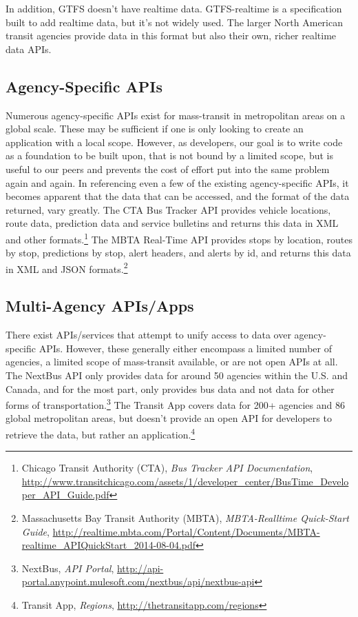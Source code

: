 \documentclass[12pt]{article}
\begin{document}
In addition, GTFS doesn't have realtime data. GTFS-realtime is a specification built to add
realtime data, but it's not widely used. The larger North American transit agencies provide
data in this format but also their own, richer realtime data APIs.

\subsection{Agency-Specific APIs}

Numerous agency-specific APIs exist for mass-transit in metropolitan areas on a global scale.
These may be sufficient if one is only looking to create an application with a local scope. However,
as developers, our goal is to write code as a foundation to be built upon, that is not bound by a
limited scope, but is useful to our peers and prevents the cost of effort put into the same 
problem again and again. In referencing even a few of the existing agency-specific APIs, it
becomes apparent that the data that can be accessed, and the format of the data returned, 
vary greatly. The CTA Bus Tracker API provides vehicle locations, route data, prediction data and 
service bulletins and returns this data in XML and other formats.\footnote{Chicago Transit Authority (CTA), \textit{Bus Tracker API Documentation},
\url{http://www.transitchicago.com/assets/1/developer\_center/BusTime\_Developer\_API\_Guide.pdf}} The MBTA Real-Time API provides
stops by location, routes by stop, predictions by stop, alert headers, and alerts by id, and returns 
this data in XML and JSON formats.\footnote{Massachusetts Bay Transit Authority (MBTA), \textit{MBTA-Realltime Quick-Start Guide},
\url{http://realtime.mbta.com/Portal/Content/Documents/MBTA-realtime\_APIQuickStart\_2014-08-04.pdf}}

\subsection{Multi-Agency APIs/Apps}
There exist APIs/services that attempt to unify access to data over agency-specific APIs.
However, these generally either encompass a limited number of agencies, a limited scope
of mass-transit available, or are not open APIs at all. The NextBus API only provides data for
around 50 agencies within the U.S. and Canada, and for the most part, only provides bus data 
and not data for other forms of transportation.\footnote{NextBus, \textit{API Portal}, \url{http://api-portal.anypoint.mulesoft.com/nextbus/api/nextbus-api}} The Transit App covers data for 200+ agencies
and 86 global metropolitan areas, but doesn't provide an open API for developers to retrieve the
data, but rather an application.\footnote{Transit App, \textit{Regions}, \url{http://thetransitapp.com/regions}}
\end{document}
